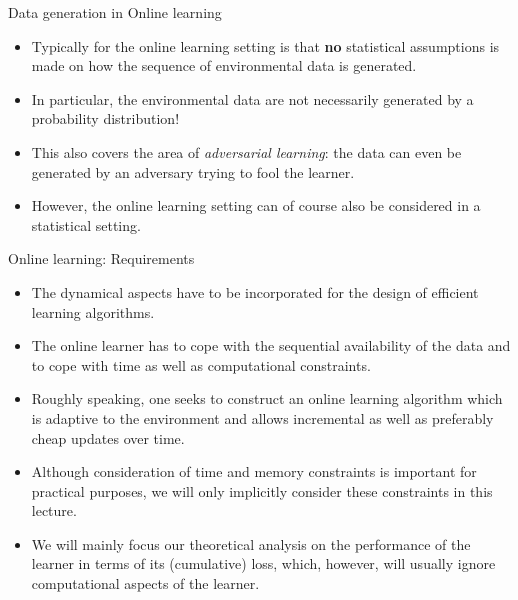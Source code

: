 \documentclass[11pt,compress,t,notes=noshow, xcolor=table]{beamer}
\begin{document}
\begin{frame}{Data generation in Online learning}
%	
	\begin{itemize}
%		
		\item Typically for the online learning setting is that \textbf{no} statistical assumptions is made on how the sequence of environmental data is generated.
%		
		\item In particular, the environmental data are not necessarily generated by a probability distribution!
%		
		\pause
		\item This also covers the area of \emph{adversarial learning}: the data can even be generated by an adversary trying to fool the learner.
%		
		\item However, the online learning setting can of course also be considered in a statistical setting.
%		
	\end{itemize}
%	
\end{frame}


\begin{frame}{Online learning: Requirements}
	\small
	\begin{itemize}
		\item The dynamical aspects have to be incorporated for the design of efficient learning algorithms. 
		 \item The online learner has to cope with the sequential availability of the data and to cope with time as well as computational constraints.
		 \item Roughly speaking, one seeks to construct an online learning algorithm which is adaptive to the environment and allows incremental as well as preferably cheap updates over time.
		\pause 
		 \item Although consideration of time and memory constraints is important for practical purposes, we will only implicitly consider these constraints in this lecture. 
		 \item We will mainly focus our theoretical analysis on the performance of the learner in terms of its (cumulative) loss, which, however, will usually ignore computational aspects of the learner.
	\end{itemize}
\end{frame}
\end{document}
